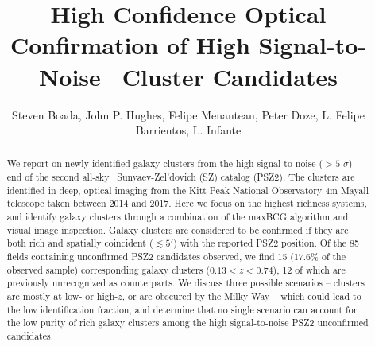 \documentclass[apj, revtex4-1]{emulateapj}
\begin{document}
\title{High Confidence Optical Confirmation of High Signal-to-Noise \planck\ Cluster Candidates}

\author{\sc Steven Boada,
John P. Hughes,
Felipe Menanteau,
Peter Doze,
L. Felipe Barrientos,
L. Infante
}



\begin{abstract}
\noindent We report on newly identified galaxy clusters from the high signal-to-noise ($>5$-$\sigma$) end of the second all-sky \planck\ Sunyaev-Zel'dovich (SZ) catalog (PSZ2). The clusters are identified in deep, optical imaging from the Kitt Peak National Observatory 4m Mayall telescope taken between 2014 and 2017. Here we focus on the highest richness systems, and identify galaxy clusters through a combination of the maxBCG algorithm and visual image inspection. Galaxy clusters are considered to be confirmed if they are both rich and spatially coincident ($\lesssim 5'$) with the reported PSZ2 position. Of the 85 fields containing unconfirmed PSZ2 candidates observed, we find 15 (17.6\% of the observed sample) corresponding galaxy clusters ($ 0.13 < z < 0.74$), 12 of which are previously unrecognized as counterparts. We discuss three possible scenarios -- clusters are mostly at low- or high-$z$, or are obscured by the Milky Way -- which could lead to the low identification fraction, and determine that no single scenario can account for the low purity of rich galaxy clusters among the high signal-to-noise PSZ2 unconfirmed candidates.
\end{abstract}
\end{document}
